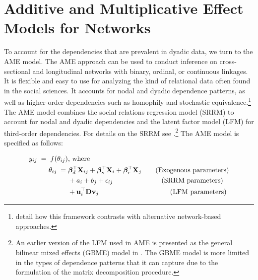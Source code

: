 

\section{\textbf{Additive and Multiplicative Effect Models for Networks}}

To account for the dependencies that are prevalent in dyadic data, we turn to the AME model. The AME approach can be used to conduct inference on cross-sectional and longitudinal networks with binary, ordinal, or continuous linkages. It is flexible and easy to use for analyzing the kind of relational data often found in the social sciences. It accounts for nodal and dyadic dependence patterns, as well as higher-order dependencies such as homophily and stochastic equivalence.\footnote{\citet{minhas:etal:2018} detail how this framework contrasts with alternative network-based approaches.} The AME model combines the social relations regression model (SRRM) to account for nodal and dyadic dependencies and the latent factor model (LFM) for third-order dependencies.  For details on the SRRM see \citet{li:loken:2002,hoff:2005,dorff:minhas:2017}.\footnote{An earlier version of the LFM  used in AME is presented as the general bilinear mixed effects (GBME) model in \citet{hoff:2005}. The GBME model is more limited in the types of dependence patterns that it can capture due to the formulation of the matrix decomposition procedure.} The AME model is specified as follows:

\begin{align}
	\begin{aligned}
		y_{ij} \;=\; f(\theta_{ij}) &\text{, where } \\
		\theta_{ij} \;=\;& \bm\beta_{d}^{\top} \mathbf{X}_{ij} + \bm\beta_{s}^{\top} \mathbf{X}_{i} + \bm\beta_{r}^{\top} \mathbf{X}_{j} \text{\qquad(Exogenous parameters)} \\
		& + a_{i} + b_{j} + \epsilon_{ij} \text{\qquad\qquad\qquad\quad(SRRM parameters)} \\
		& + \mathbf{u}_{i}^{\top} \mathbf{D} \mathbf{v}_{j}  \text{\qquad\qquad\qquad\qquad\qquad\;(LFM parameters)} \\ 
	\label{eqn:ame}
	\end{aligned}
\end{align}

